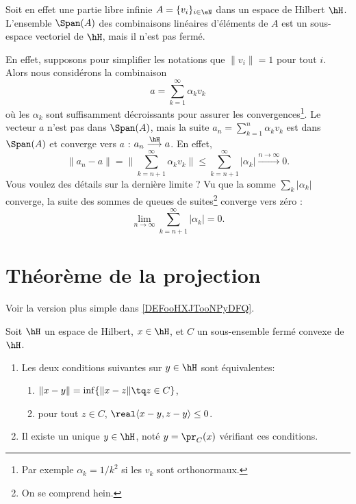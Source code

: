 Soit en effet une partie libre infinie \( A=\{ v_i \}_{i\in \eN}\) dans un espace de Hilbert \( \hH\). L'ensemble \( \Span(A)\) des combinaisons linéaires d'éléments de \( A\) est un sous-espace vectoriel de \( \hH\), mais il n'est pas fermé.

En effet, supposons pour simplifier les notations que \( \| v_i \|=1\) pour tout \( i\). Alors nous considérons la combinaison
\begin{equation}
	a=\sum_{k=1}^{\infty}\alpha_kv_k
\end{equation}
où les \( \alpha_k\) sont suffisamment décroissants pour assurer les convergences\footnote{Par exemple \( \alpha_k=1/k^2\) si les \( v_k\) sont orthonormaux.}. Le vecteur \( a\) n'est pas dans \( \Span(A)\), mais la suite \( a_n=\sum_{k=1}^{n}\alpha_kv_k\) est dans \( \Span(A)\) et converge vers \( a\) : \( a_n\stackrel{\hH}{\longrightarrow}a\). En effet,
\begin{equation}
	\| a_n-a \|=\| \sum_{k=n+1}^{\infty}\alpha_kv_k \|\leq \sum_{k=n+1}^{\infty}| \alpha_k | \stackrel{n\to\infty}{\longrightarrow}0.
\end{equation}
Vous voulez des détails sur la dernière limite ? Vu que la somme \( \sum_k| \alpha_k |\) converge, la suite des sommes de queues de suites\footnote{On se comprend hein.} converge vers zéro :
\begin{equation}
	\lim_{n\to \infty} \sum_{k=n+1}^{\infty}| \alpha_k |=0.
\end{equation}

\section{Théorème de la projection}

Voir la version plus simple dans \ref{DEFooHXJTooNPyDFQ}.
\begin{theorem} \label{ThoProjOrthuzcYkz}
	Soit \( \hH\) un espace de Hilbert, \( x\in \hH\), et \( C\) un sous-ensemble fermé convexe de \( \hH\).
	\begin{enumerate}
		\item
		      Les deux conditions suivantes sur \( y\in \hH\) sont équivalentes:
		      \begin{enumerate}
			      \item   \label{ETsfYCSItemi}
			            \( \| x-y \|=\inf\{ \| x-z \|\tq z\in C \}\),
			      \item\label{ETsfYCSItemii}
			            pour tout \( z\in C\), \( \real\langle x-y, z-y\rangle \leq 0\).
		      \end{enumerate}
		\item
		      Il existe un unique \( y\in \hH\), noté \( y=\pr_C(x)\) vérifiant ces conditions.
	\end{enumerate}
\end{theorem}


